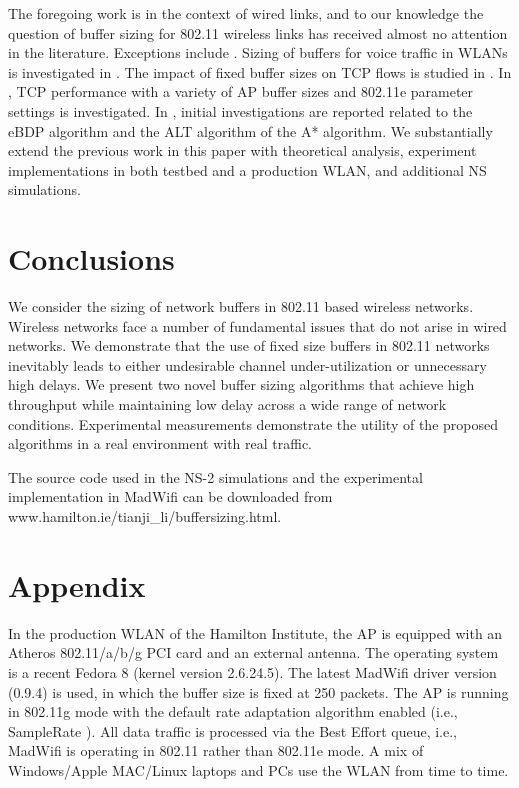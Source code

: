 \documentclass[10pt,twocolumn, journal]{IEEEtran}
\begin{document}
The foregoing work is in the context of wired links, and to our knowledge the question of
buffer sizing for 802.11 wireless links has received almost no attention in the
literature. Exceptions include \cite{Malone_BufferSizing_voip}
\cite{Pilosof_INFOCOM_2003} \cite{Thottan_wicon_2006}. Sizing of buffers for voice
traffic in WLANs is investigated in \cite{Malone_BufferSizing_voip}.  The impact of fixed
buffer sizes on TCP flows is studied in \cite{Pilosof_INFOCOM_2003}. In
\cite{Thottan_wicon_2006}, TCP performance with a variety of AP buffer sizes and 802.11e
parameter settings is investigated.  In \cite{Li_commletter_2007}
\cite{Li_chinacom_2008}, initial investigations are reported related to the eBDP
algorithm and the ALT algorithm of the A* algorithm. We substantially extend the previous
work in this paper with theoretical analysis, experiment implementations in both testbed
and a production WLAN, and additional NS simulations.


\section{Conclusions } \label{sec_concl}

We consider the sizing of network buffers in 802.11 based wireless networks.   Wireless
networks face a number of fundamental issues that do not arise in wired networks.  We
demonstrate that the use of fixed size buffers in 802.11 networks inevitably leads to
either undesirable channel under-utilization or unnecessary high delays.  We present two
novel buffer sizing algorithms that achieve high throughput while maintaining low delay across a wide range of network conditions.   Experimental measurements demonstrate the utility of the proposed algorithms  in a real environment with real traffic.

The source code used in the NS-2 simulations and the experimental implementation in
MadWifi can be downloaded from www.hamilton.ie/tianji\_li/buffersizing.html.



\section*{Appendix}

In the production WLAN of the Hamilton Institute, the AP is equipped with an Atheros 802.11/a/b/g PCI card and an external antenna. The operating system is a recent Fedora 8 (kernel version 2.6.24.5). The latest MadWifi driver version (0.9.4) is used, in which the buffer size is fixed at 250 packets. The AP is running in 802.11g mode with the default rate adaptation algorithm enabled (i.e., SampleRate \cite{Bicket_msthesis_2005}). All data traffic is processed via the Best
Effort queue, i.e., MadWifi is operating in 802.11 rather than 802.11e mode. A
mix of Windows/Apple MAC/Linux laptops and PCs use the WLAN from time to time.
\end{document}
